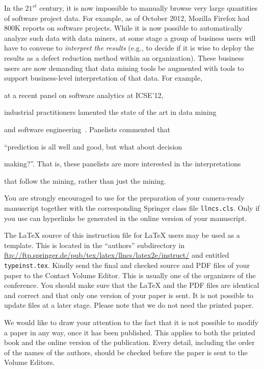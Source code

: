 \documentclass[runningheads]{llncs}
\begin{document}
{In the $21^{st}$ century, it is now impossible to manually browse very
large quantities of software project data.
For example, as of October 2012,
Mozilla Firefox had 800K reports on software projects.  While it is
now possible to automatically analyze such data with data miners, at
some stage a group of business users will have to convene to {\em
  interpret the results} (e.g., to decide if it is wise to deploy the
results as a defect reduction method within an organization).
These business  users are now demanding that data mining tools
be augmented with tools to support  business-level
interpretation of that data. For example,

at a recent panel on software analytics at ICSE'12,

industrial practitioners lamented the state of the art in data mining

and software engineering~\cite{menzies12a}. Panelists commented that

``prediction is all well and good, but what about decision

making?''. That is, these panelists are more interested in the interpretations

that follow the mining, rather than just  the mining.


You are strongly encouraged to use \LaTeXe{} for the
preparation of your camera-ready manuscript together with the
corresponding Springer class file \verb+llncs.cls+. Only if you use
\LaTeXe{} can hyperlinks be generated in the online version
of your manuscript.

The \LaTeX{} source of this instruction file for \LaTeX{} users may be used as
a template. This is located in the ``authors'' subdirectory in
\url{ftp://ftp.springer.de/pub/tex/latex/llncs/latex2e/instruct/} and
entitled \texttt{typeinst.tex}. Kindly
send the final and checked source and PDF files of your paper to the
Contact Volume Editor. This is usually one of the organizers of the
conference. You should make sure that the \LaTeX{} and the PDF files are
identical and correct and that only one version of your paper is sent.
It is not possible to update files at a later stage. Please note that we
do not need the printed paper.

We would like to draw your attention to the fact that it is not possible
to modify a paper in any way, once it has been published. This applies 
to both the printed book and the online version of the publication. 
Every detail, including the order of the names of the authors, should 
be checked before the paper is sent to the Volume Editors.

}
\end{document}
